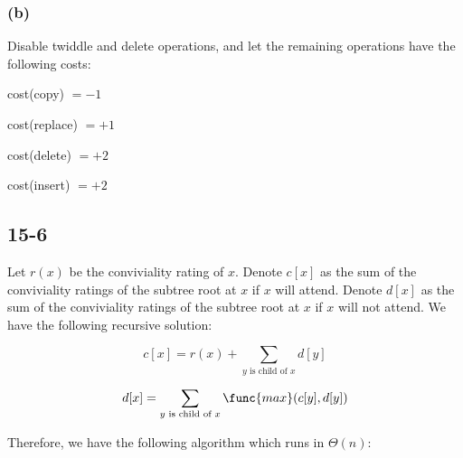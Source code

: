 \subsubsection*{(b)}

\noindent
Disable twiddle and delete operations,
and let the remaining operations have the following costs:

cost(copy) $= -1$

cost(replace) $= +1$

cost(delete) $= +2$

cost(insert) $= +2$

\subsection*{15-6}

\noindent
Let $r(x)$ be the conviviality rating of $x$.
Denote $c[x]$ as the sum of the conviviality ratings of 
the subtree root at $x$ if $x$ will attend.
Denote $d[x]$ as the sum of the conviviality ratings of 
the subtree root at $x$ if $x$ will not attend.
We have the following recursive solution:

\begin{equation*}
    c[x] = r(x) + \sum\limits_{y \text{ is child of } x} d[y]
\end{equation*}

\begin{equation*}
    d[x] = \sum\limits_{y \text{ is child of } x} \func{max}(c[y], d[y])
\end{equation*}

\noindent
Therefore, we have the following algorithm which runs in $\Theta(n)$:


